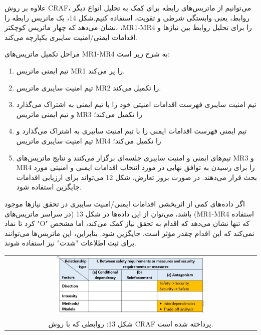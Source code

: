 \documentclass[a4paper,10pt]{article}
\begin{document}
                علاوه بر روش CRAF، می‌توانیم از ماتریس‌های رابطه برای کمک به تحلیل انواع دیگر روابط، یعنی وابستگی شرطی و تقویت، استفاده کنیم.شکل 14، یک ماتریس رابطه را نشان می‌دهد که چهار ماتریس کوچکتر، ،MR1-MR4 را برای تحلیل روابط بین نیازها و اقدامات ایمنی/امنیت سایبری یکپارچه می‌کند.

                مراحل تکمیل ماتریس‌های MR1-MR4 به شرح زیر است:

                \begin{enumerate}
                    
                    \item تیم ایمنی ماتریس MR1 را پر می‌کند.

                    \item تیم امنیت سایبری ماتریس MR2 را تکمیل می‌کند.

                    \item تیم امنیت سایبری فهرست اقدامات امنیتی خود را با تیم ایمنی به اشتراک می‌گذارد و تیم ایمنی ماتریس MR3 را تکمیل می‌کند؛

                    \item تیم ایمنی فهرست اقدامات ایمنی را با تیم امنیت سایبری به اشتراک می‌گذارد و تیم امنیت سایبری ماتریس MR4 را تکمیل می‌کند؛

                    \item تیم‌های ایمنی و امنیت سایبری جلسه‌ای برگزار می‌کنند و نتایج ماتریس‌های MR3 و MR4 را برای رسیدن به توافق نهایی در مورد انتخاب اقدامات ایمنی و امنیتی مورد بحث قرار می‌دهند. در صورت بروز تعارض، شکل 12 می‌تواند برای ارزیابی اقدامات جایگزین استفاده شود.

                \end{enumerate}

                اگر داده‌های کمی از اثربخشی اقدامات ایمنی/امنیت سایبری در تحقق نیازها موجود باشد، می‌توان از این داده‌ها در شکل 13 (در سراسر ماتریس‌های (MR1-MR4 استفاده کرد تا نماد "O" که تنها نشان می‌دهد که اقدام به تحقق نیاز کمک می‌کند، اما مشخص نمی‌کند که این اقدام چقدر مؤثر است، جایگزین شود. بنابراین، این ماتریس‌ها می‌توانند برای ثبت اطلاعات "شدت" نیز استفاده شوند.

                \begin{table}
            
                    \centering
                    \begin{tabular}{ c }
                        
                        \includegraphics[width=0.6\textwidth]{Image/fig13.jpg} \\
        
                        شکل 13: روابطی که با روش CRAF پرداخته شده است.
        
                    \end{tabular}
        
                \end{table}
\end{document}
